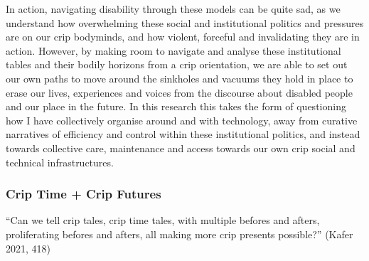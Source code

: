 In action, navigating disability through these models can be quite sad,
as we understand how overwhelming these social and institutional
politics and pressures are on our crip bodyminds, and how violent,
forceful and invalidating they are in action. However, by making room to
navigate and analyse these institutional tables and their bodily
horizons from a crip orientation, we are able to set out our own paths
to move around the sinkholes and vacuums they hold in place to erase our
lives, experiences and voices from the discourse about disabled people
and our place in the future. In this research this takes the form of
questioning how I have collectively organise around and with technology,
away from curative narratives of efficiency and control within these
institutional politics, and instead towards collective care, maintenance
and access towards our own crip social and technical infrastructures.

\hypertarget{crip-time-crip-futures}{%
\subsubsection[Crip Time + Crip
Futures]{\texorpdfstring{\protect\hypertarget{anchor}{}{}Crip Time +
Crip Futures}{Crip Time + Crip Futures}}\label{crip-time-crip-futures}}

``Can we tell crip tales, crip time tales, with multiple befores and
afters, proliferating befores and afters, all making more crip presents
possible?'' (Kafer 2021, 418)

